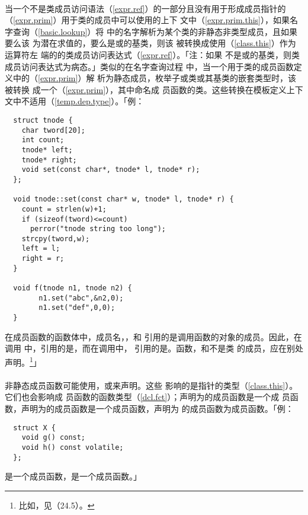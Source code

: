 \paragraph{}
当一个不是类成员访问语法（\ref{expr.ref}）的一部分且没有用于形成成员指针的
（\ref{expr.prim}）用于类的成员中可以使用的上下
文中（\ref{expr.prim.this}），如果名字查询（\ref{basic.lookup}）将
中的名字解析为某个类的非静态非类型成员，且如果要么该
为潜在求值的，要么是或的基类，则该
被转换成使用（\ref{class.this}）作为运算符左
端的的类成员访问表达式（\ref{expr.ref}）。「注：如果
不是或的基类，则类成员访问表达式为病态。」类似的在名字查询过程
中，当一个用于类的成员函数定义中的（\ref{expr.prim}）解
析为静态成员，枚举子或类或其基类的嵌套类型时，该被转换
成一个（\ref{expr.prim}），其中命名成
员函数的类。这些转换在模板定义上下文中不适用（\ref{temp.dep.type}）。「例：
\begin{lstlisting}
  struct tnode {
    char tword[20];
    int count;
    tnode* left;
    tnode* right;
    void set(const char*, tnode* l, tnode* r);
  };

  void tnode::set(const char* w, tnode* l, tnode* r) {
    count = strlen(w)+1;
    if (sizeof(tword)<=count)
      perror("tnode string too long");
    strcpy(tword,w);
    left = l;
    right = r;
  }

  void f(tnode n1, tnode n2) {
		n1.set("abc",&n2,0);
		n1.set("def",0,0);
  }
\end{lstlisting}
在成员函数的函数体中，成员名，，和
引用的是调用函数的对象的成员。因此，在调用
中，引用的是，而在调用中，
引用的是。函数，和不是类
的成员，应在别处声明。\footnote{比如，见（24.5）。}」

\paragraph{}
非静态成员函数可能使用，或来声明。这些
影响的是指针的类型（\ref{class.this}）。它们也会影响成
员函数的函数类型（\ref{dcl.fct}）；声明为的成员函数是一个成
员函数，声明为的成员函数是一个成员函数，声明为
的成员函数为成员函数。「例：
\begin{lstlisting}
  struct X {
    void g() const;
    void h() const volatile;
  };
\end{lstlisting}
是一个成员函数，是一个成员函数。」

